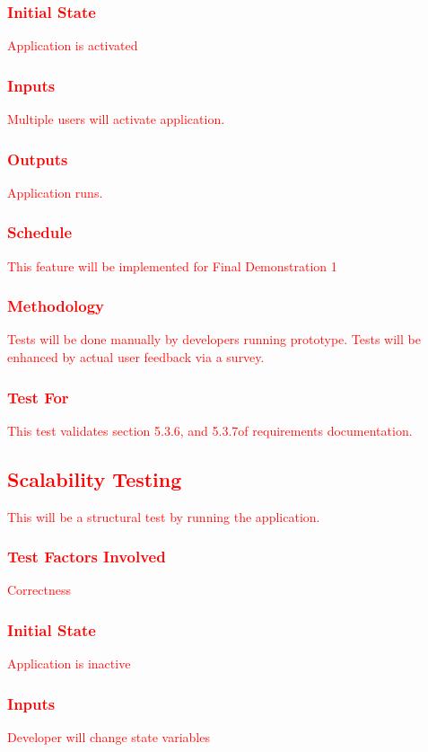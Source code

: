 \documentclass[11pt, oneside]{article}   	%
\begin{document}
\subsubsection{\textcolor{red}{Initial State}}
\textcolor{red}{Application is activated}
\subsubsection{\textcolor{red}{Inputs}}
\textcolor{red}{Multiple users will activate application.}
\subsubsection{\textcolor{red}{Outputs}}
\textcolor{red}{Application runs.}
\subsubsection{\textcolor{red}{Schedule}}
\textcolor{red}{This feature will be implemented for Final Demonstration 1}
\subsubsection{\textcolor{red}{Methodology}}
\textcolor{red}{Tests will be done manually by developers running prototype. Tests will be enhanced by actual user feedback via a survey.}
\subsubsection{\textcolor{red}{Test For}}
\textcolor{red}{This test validates section 5.3.6, and 5.3.7of requirements documentation.}


\subsection{\textcolor{red}{Scalability Testing}}
\textcolor{red}{This will be a structural test by running the application.}
\subsubsection{\textcolor{red}{Test Factors Involved}}
\textcolor{red}{Correctness}
\subsubsection{\textcolor{red}{Initial State}}
\textcolor{red}{Application is inactive}
\subsubsection{\textcolor{red}{Inputs}}
\textcolor{red}{Developer will change state variables}
\end{document}
